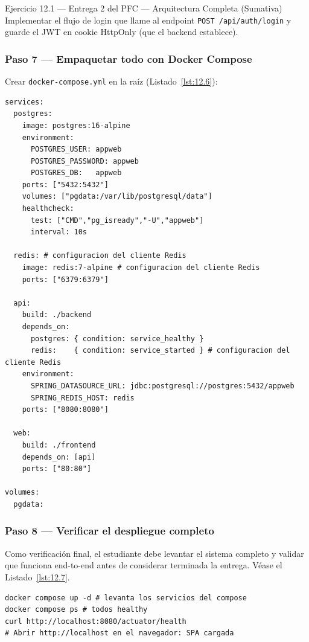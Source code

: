 \begin{cajaejercicio}{Ejercicio 12.1 --- Entrega 2 del PFC --- Arquitectura Completa (Sumativa)}
Implementar el flujo de login que llame al endpoint
\texttt{POST /api/auth/login} y guarde el JWT en cookie HttpOnly
(que el backend establece).

\subsubsection*{Paso 7 --- Empaquetar todo con Docker Compose}

Crear \texttt{docker-compose.yml} en la raíz (Listado~\ref{lst:12.6}):

\begin{lstlisting}[style=yaml,numbers=none,caption={Ejemplo de YAML},label=lst:12.6]
services:
  postgres:
    image: postgres:16-alpine
    environment:
      POSTGRES_USER: appweb
      POSTGRES_PASSWORD: appweb
      POSTGRES_DB:   appweb
    ports: ["5432:5432"]
    volumes: ["pgdata:/var/lib/postgresql/data"]
    healthcheck:
      test: ["CMD","pg_isready","-U","appweb"]
      interval: 10s

  redis: # configuracion del cliente Redis
    image: redis:7-alpine # configuracion del cliente Redis
    ports: ["6379:6379"]

  api:
    build: ./backend
    depends_on:
      postgres: { condition: service_healthy }
      redis:    { condition: service_started } # configuracion del cliente Redis
    environment:
      SPRING_DATASOURCE_URL: jdbc:postgresql://postgres:5432/appweb
      SPRING_REDIS_HOST: redis
    ports: ["8080:8080"]

  web:
    build: ./frontend
    depends_on: [api]
    ports: ["80:80"]

volumes:
  pgdata:
\end{lstlisting}

\subsubsection*{Paso 8 --- Verificar el despliegue completo}

Como verificación final, el estudiante debe levantar el
sistema completo y validar que funciona end-to-end antes de
considerar terminada la entrega. V\'ease el Listado~\ref{lst:12.7}.


\begin{lstlisting}[style=shell,numbers=none,caption={Ejemplo de Shell},label=lst:12.7]
docker compose up -d # levanta los servicios del compose
docker compose ps # todos healthy
curl http://localhost:8080/actuator/health
# Abrir http://localhost en el navegador: SPA cargada
\end{lstlisting}


\end{cajaejercicio}
